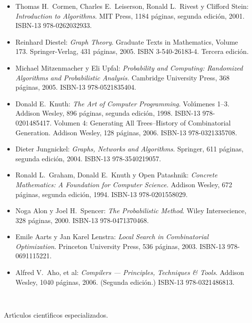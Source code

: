 \documentclass[10 pt]{article}
\begin{document}
   \begin{itemize}[itemsep=0em]

 \item Thomas H.\ {\sc Cormen}, Charles E.\ {\sc Leiserson}, Ronald L.\
   Rivest y Clifford {\sc Stein}: {\em Introduction to                                                                                                                    
     Algorithms}. MIT Press, 1184 p\'{a}ginas, segunda edici\'{o}n,
   2001. ISBN-13 978-0262032933.

 \item Reinhard {\sc Diestel}: {\em Graph Theory}. Graduate Texts in
   Mathematics, Volume 173. Springer-Verlag, 431 p\'{a}ginas, 2005. ISBN
   3-540-26183-4. Tercera edici\'{o}n.

 \item Michael {\sc Mitzenmacher} y Eli {\sc Upfal}: {\em Probability                                                                                                     
     and Computing: Randomized Algorithms and Probabilistic Analysis.}
   Cambridge University Press, 368 p\'{a}ginas, 2005. ISBN-13
   978-0521835404.

 \item Donald E.\ {\sc Knuth}: {\em The Art of Computer
     Programming}. Vol\'{u}menes 1--3. Addison Wesley, 896
   p\'{a}ginas, segunda edici\'{o}n, 1998. ISBN-13
   978-0201485417. Volumen 4: Generating All Trees--History of
   Combinatorial Generation. Addison Wesley, 128 p\'{a}ginas,
   2006. ISBN-13 978-0321335708.

\item Dieter {\sc Jungnickel}: {\em Graphs, Networks and
    Algorithms}. Springer, 611 p\'{a}ginas, segunda edici\'{o}n,
  2004. ISBN-13 978-3540219057.

\item Ronald L.\ {\sc Graham}, Donald E.\ {\sc Knuth} y Open {\sc
         Patashnik}: {\em Concrete Mathematics: A Foundation for
         Computer
         Science.} Addison Wesley, 672 p\'{a}ginas, segunda edici\'{o}n,
       1994. ISBN-13 978-0201558029.

     \item Noga {\sc Alon} y Joel H.\ {\sc Spencer}: {\em The
         Probabilistic Method}. Wiley Intersecience, 328 p\'{a}ginas,
       2000. ISBN-13 978-0471370468.

        \item Emile {\sc Aarts} y Jan Karel {\sc Lenstra}: {\em Local
            Search
                 in Combinatorial Optimization}. Princeton University
               Press, 536
               p\'{a}ginas, 2003. ISBN-13 978-0691115221.

               \item Alfred V.\ {\sc Aho}, et al: {\em Compilers ---
                   Principles,
                       Techniques \& Tools}. Addison Wesley, 1040
                     p\'{a}ginas, 2006. (Segunda
                     edici\'{o}n.) ISBN-13 978-0321486813.

                   \end{itemize}
                   ~

Art\'{\i}culos cient\'{\i}ficos especializados.

\label{final} %


\end{document}
